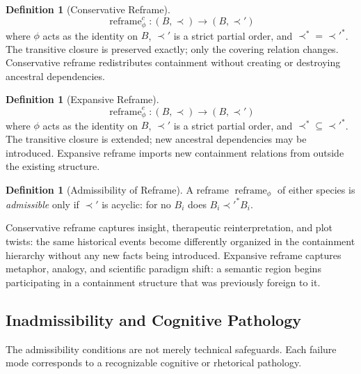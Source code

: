 \documentclass[12pt, a4paper]{article}
\theoremstyle{plain}
\theoremstyle{definition}
\newtheorem{definition}[theorem]{Definition}
\theoremstyle{remark}
\DeclareMathOperator{\Reframe}{reframe}
\begin{document}
\begin{definition}[Conservative Reframe]
\[
  \Reframe^c_\phi : (B, \prec) \to (B, \prec')
\]
where $\phi$ acts as the identity on $B$, $\prec'$ is a strict partial order,
and $\prec^* = \prec'^*$. The transitive closure is preserved exactly;
only the covering relation changes. Conservative reframe redistributes
containment without creating or destroying ancestral dependencies.
\end{definition}

\begin{definition}[Expansive Reframe]
\[
  \Reframe^e_\phi : (B, \prec) \to (B, \prec')
\]
where $\phi$ acts as the identity on $B$, $\prec'$ is a strict partial order,
and $\prec^* \subseteq \prec'^*$. The transitive closure is extended; new
ancestral dependencies may be introduced. Expansive reframe imports new
containment relations from outside the existing structure.
\end{definition}

\begin{definition}[Admissibility of Reframe]
A reframe $\Reframe_\phi$ of either species is \emph{admissible} only if
$\prec'$ is acyclic: for no $B_i$ does $B_i \prec'^* B_i$.
\end{definition}

Conservative reframe captures insight, therapeutic reinterpretation, and plot
twists: the same historical events become differently organized in the
containment hierarchy without any new facts being introduced. Expansive
reframe captures metaphor, analogy, and scientific paradigm shift: a semantic
region begins participating in a containment structure that was previously
foreign to it.

\subsection{Inadmissibility and Cognitive Pathology}

The admissibility conditions are not merely technical safeguards. Each
failure mode corresponds to a recognizable cognitive or rhetorical pathology.
\end{document}
